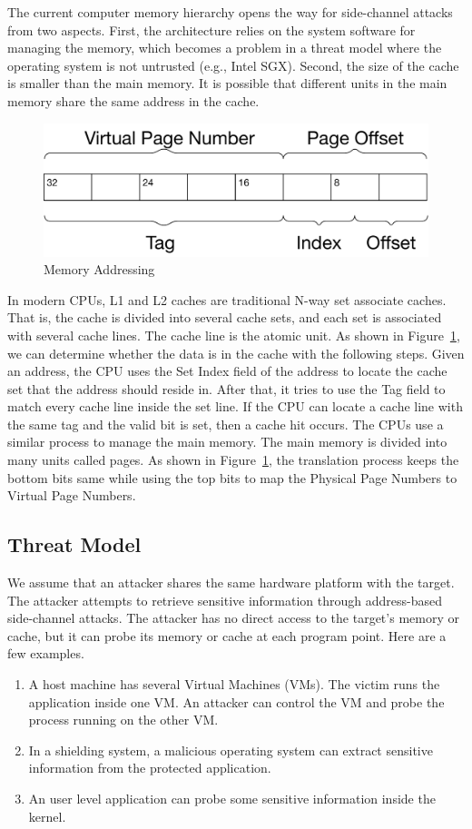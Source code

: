 The current computer memory hierarchy opens the way for side-channel attacks from two aspects. First, the architecture relies on the system software for managing the memory, which becomes a problem in a threat model where the operating system is not untrusted (e.g., Intel SGX). Second, the size of the cache is smaller than the main memory. It is possible that different units in the main memory share the same address in the cache.
\begin{figure}
  \centering
  \includegraphics[width=.65\columnwidth]{./figures/chapter3/address.pdf}
  \caption{Memory Addressing}\label{fig:memory_address}
\end{figure}

In modern CPUs, L1 and L2 caches are traditional N-way set associate caches. That is, the cache is divided into several cache sets, and each set is associated with several cache lines. The cache line is the atomic unit. As shown in Figure~\ref{fig:memory_address}, we can determine whether the data is in the cache with the following steps.  Given an address, the CPU uses the \textsf{Set Index} field of the address to locate the cache set that the address should reside in. After that, it tries to use the \textsf{Tag} field to match every cache line inside the set line. If the CPU can locate a cache line with the same tag and the valid bit is set, then a cache hit occurs. The CPUs use a similar process to manage the main memory. The main memory is divided into many units called pages. As shown in Figure~\ref{fig:memory_address},
the translation process keeps the bottom bits same while using the top bits to map the Physical Page Numbers to Virtual Page Numbers.

\subsection{Threat Model}
We assume that an attacker shares the same hardware platform with the target.
The attacker attempts to retrieve sensitive information through address-based
side-channel attacks. The attacker has no direct access to the target's memory or cache,
but it can probe its memory or cache at each program point. Here are a few examples.
\begin{enumerate}
  \item A host machine has several Virtual Machines (VMs). The victim runs the application inside one VM. An attacker can control the VM and probe the process running on the other VM.
  \item  In a shielding system, a malicious operating system can extract sensitive information from the protected application.
  \item An user level application can probe some sensitive information inside the kernel.
\end{enumerate}

